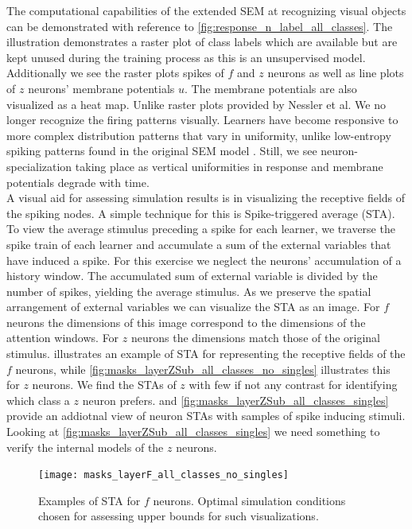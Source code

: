 \documentclass{report}
\begin{document}
The computational capabilities of the extended SEM at recognizing visual objects can be demonstrated with reference to \cref{fig:response_n_label_all_classes}. The illustration demonstrates a raster plot of class labels which are available but are kept unused during the training process as this is an unsupervised model. Additionally we see the raster plots spikes of $f$ and $z$ neurons as well as line plots of $z$ neurons' membrane potentials $u$. The membrane potentials are also visualized as a heat map. Unlike raster plots provided by Nessler et al. We no longer recognize the firing patterns visually. Learners have become responsive to more complex distribution patterns that vary in uniformity, unlike low-entropy spiking patterns found in the original SEM model \cite{Nessler2010}. Still, we see neuron-specialization taking place as vertical uniformities in response and membrane potentials degrade with time.\\

A visual aid for assessing simulation results is in visualizing the receptive fields of the spiking nodes. A simple technique for this is Spike-triggered average (STA). To view the average stimulus preceding a spike for each learner, we traverse the spike train of each learner and accumulate a sum of the external variables that have induced a spike. For this exercise we neglect the neurons' accumulation of a history window. The accumulated sum of external variable is divided by the number of spikes, yielding the average stimulus. As we preserve the spatial arrangement of external variables we can visualize the STA as an image. For $f$ neurons the dimensions of this image correspond to the dimensions of the attention windows. For $z$ neurons the dimensions match those of the original stimulus.  illustrates an example of STA for representing the receptive fields of the $f$ neurons, while \cref{fig:masks_layerZSub_all_classes_no_singles} illustrates this for $z$ neurons. We find the STAs of $z$ with few if not any contrast for identifying which class a $z$ neuron prefers.  and \cref{fig:masks_layerZSub_all_classes_singles} provide an addiotnal view of neuron STAs with samples of spike inducing stimuli. Looking at \cref{fig:masks_layerZSub_all_classes_singles} we need something to verify the internal models of the $z$ neurons.

\begin{figure}[ht]
\centering
\texttt{[image: masks\_layerF\_all\_classes\_no\_singles]}
\caption{Examples of STA for $f$ neurons. Optimal simulation conditions chosen for assessing upper bounds for such visualizations.
\label{fig:masks_layerF_all_classes_no_singles}}
\end{figure}
\end{document}
